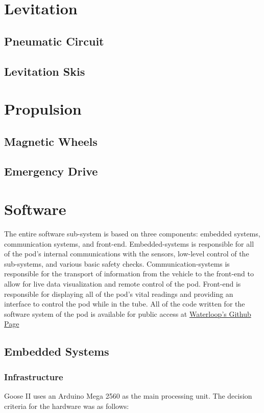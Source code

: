 \documentclass[11pt,a4paper,oldfontcommands]{memoir}
\begin{document}
\section{Levitation}

\subsection{Pneumatic Circuit}

\subsection{Levitation Skis}

\section{Propulsion}

\subsection{Magnetic Wheels}

\subsection{Emergency Drive}

\section{Software}
The entire software sub-system is based on three components: embedded systems, communication systems, and front-end. Embedded-systems is responsible for all of the pod's internal communications with the sensors, low-level control of the sub-systems, and various basic safety checks. Communication-systems is responsible for the transport of information from the vehicle to the front-end to allow for live data visualization and remote control of the pod. Front-end is responsible for displaying all of the pod's vital readings and providing an interface to control the pod while in the tube. All of the code written for the software system of the pod is available for public access at \href{http://www.sharelatex.com}{Waterloop's Github Page}

\subsection{Embedded Systems}

\subsubsection{Infrastructure}
Goose II uses an Arduino Mega 2560 as the main processing unit. The decision criteria for the hardware was as follows:
\end{document}
